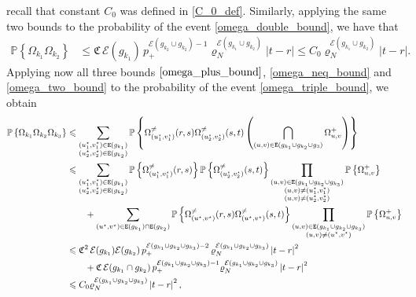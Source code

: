 \documentclass[11pt,reqno]{amsart}
\numberwithin{equation}{section}
\newcommand{\abs}[1]{\left\lvert #1 \right\rvert}
\newcommand{\pk}[1]{\mathbb{P} \left\{ #1 \right \} }
\begin{document}
recall that constant $C_0$ was defined in \eqref{C_0_def}. Similarly, applying the same two bounds to the probability of the event \eqref{omega_double_bound}, we have that
\begin{align*}
    \pk{\Omega_{k_1}\Omega_{k_2}}&\leqslant {\mathfrak{C}}\,\mathcal{E}(g_{k_1})\,{p_+^{\mathcal{E}(g_{k_2}\cup g_{k_2})-1}}\varrho_N^{\mathcal{E}(g_{k_1}\cup g_{k_2})}\abs{t-r}\leqslant C_0\varrho_N^{\mathcal{E}(g_{k_1}\cup g_{k_2})}\abs{t-r}.
\end{align*}
Applying now all three bounds $\eqref{omega_plus_bound}$, \eqref{omega_neq_bound} and \eqref{omega_two_bound} to the probability of the event \eqref{omega_triple_bound}, we obtain 
\begin{align*}
    \pk{\Omega_{k_1}\Omega_{k_2}\Omega_{k_3}}&\leqslant \sum_{\substack{(u_1^{\star},v_1^{\star})\in{\tt E}(g_{k_1}) \\ (u_2^{\star},v_2^{\star})\in{\tt E}(g_{k_2})} }\pk{\Omega^{\not =}_{(u_1^{\star},v_1^{\star})}(r,s)\Omega^{\not =}_{(u_2^{\star},v_2^{\star})}(s,t)\left(\bigcap_{(u,v)\in{\tt E}(g_{k_1}\cup g_{k_2}\cup g_3)}\Omega^{+}_{u,v}\right)}\\
    &\leqslant \sum_{\substack{(u_1^{\star},v_1^{\star})\in{\tt E}(g_{k_1}) \\ (u_2^{\star},v_2^{\star})\in{\tt E}(g_{k_2})} }\pk{\Omega^{\not =}_{(u_1^{\star},v_1^{\star})}(r,s)}\pk{\Omega^{\not =}_{(u_2^{\star},v_2^{\star})}(s,t)}\prod_{\substack{(u,v)\in{\tt E}(g_{k_1}\cup g_{k_2}\cup g_{k_3}) \\ (u,v)\not= (u_1^{\star},v_1^{\star}) \\ (u,v)\not= (u_2^{\star},v_2^{\star})}}\pk{\Omega^{+}_{u,v}}\\
    &\qquad + \sum_{(u^{\star},v^{\star})\in {\tt E}({g_{k_1}})\cap {\tt E}({g_{k_2}})}\pk{\Omega^{\not =}_{(u^{\star},v^{\star})}(r,s)\Omega^{\not =}_{(u^{\star},v^{\star})}(s,t)}\prod_{\substack{(u,v)\in{\tt E}(g_{k_1}\cup g_{k_2}\cup g_{k_3}) \\ (u,v)\not= (u^{\star},v^{\star})}}\pk{\Omega^{+}_{u,v}}\\
    &\leqslant {\mathfrak{C}^2}\,\mathcal{E}(g_{k_1})\mathcal{E}(g_{k_2})\,{p_+^{\mathcal{E}(g_{k_1}\cup g_{k_2}\cup g_{k_3})-2}}\,\varrho_N^{\mathcal{E}(g_{k_1}\cup g_{k_2}\cup g_{k_3})}\abs{t-r}^2\\
    &\qquad + {\mathfrak{C}}\,\mathcal{E}(g_{k_1}\cap g_{k_2})\,{p_+^{\mathcal{E}(g_{k_1}\cup g_{k_2}\cup g_{k_3})-1}}\varrho_N^{\mathcal{E}(g_{k_1}\cup g_{k_2}\cup g_{k_3})}\abs{t-r}^2\\
    &\leqslant C_0\varrho_N^{\mathcal{E}(g_{k_1}\cup g_{k_2}\cup g_{k_3})}\abs{t-r}^2,
\end{align*}
\end{document}
